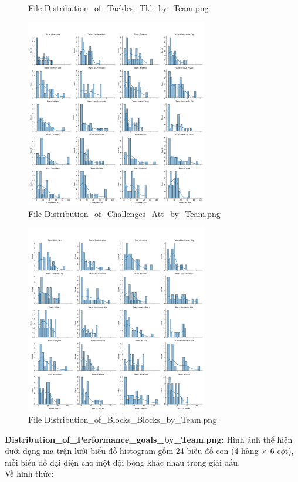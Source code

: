 \documentclass[12pt]{report}
\begin{document}
{\begin{figure}[h]
    \caption{File Distribution\_of\_Tackles\_Tkl\_by\_Team.png}
    \label{fig:p5}
\end{figure}
\begin{figure}[h]
    \centering
    \includegraphics[width=300px]{Distribution_of_Challenges_Att_by_Team.png}
    \caption{File Distribution\_of\_Challenges\_Att\_by\_Team.png}
    \label{fig:p6}
\end{figure}
\begin{figure}[h]
    \centering
    \includegraphics[width=300px]{Distribution_of_Blocks_Blocks_by_Team.png}
    \caption{File Distribution\_of\_Blocks\_Blocks\_by\_Team.png}
    \label{fig:p7}
\end{figure}
\clearpage
\textbf{Distribution\_of\_Performance\_goals\_by\_Team.png:}
Hình ảnh thể hiện dưới dạng ma trận lưới biểu đồ histogram gồm 24 biểu đồ con (4 hàng × 6 cột), mỗi biểu đồ đại diện cho một đội bóng khác nhau trong giải đấu.\\
Về hình thức:
\begin{itemize}

\end{itemize}}
\end{document}
